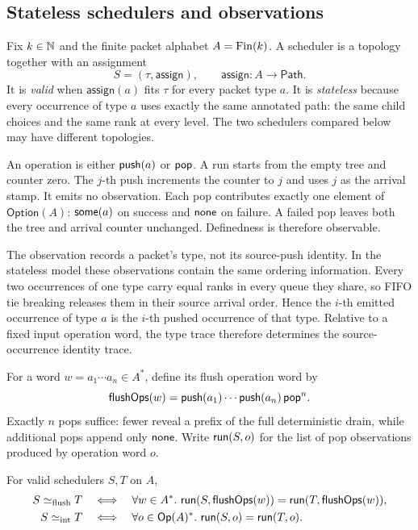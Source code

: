 \subsection{Stateless schedulers and observations}

Fix \(k\in\mathbb{N}\) and the finite packet alphabet \(A=\operatorname{Fin}(k)\).  A scheduler is
a topology together with an assignment
\[
  S=(\tau,\mathsf{assign}),
  \qquad \mathsf{assign}:A\to\mathsf{Path}.
\]
It is \emph{valid} when \(\mathsf{assign}(a)\) fits \(\tau\) for every packet
type \(a\).  It is \emph{stateless} because every occurrence of type \(a\)
uses exactly the same annotated path: the same child choices and the same rank
at every level.  The two schedulers compared below may have different
topologies.

An operation is either \(\mathsf{push}(a)\) or \(\mathsf{pop}\).  A run starts from the empty
tree and counter zero.  The \(j\)-th push increments the counter to \(j\) and
uses \(j\) as the arrival stamp.  It emits no observation.  Each pop contributes
exactly one element of \(\mathsf{Option}(A)\): \(\mathsf{some}(a)\) on success and
\(\mathsf{none}\) on failure.  A failed pop leaves both the tree and arrival counter
unchanged.  Definedness is therefore observable.

The observation records a packet's type, not its source-push identity.  In the
stateless model these observations contain the same ordering information.
Every two occurrences of one type carry equal ranks in every queue they share,
so FIFO tie breaking releases them in their source arrival order.  Hence the
\(i\)-th emitted occurrence of type \(a\) is the \(i\)-th pushed occurrence of
that type.  Relative to a fixed input operation word, the type trace therefore
determines the source-occurrence identity trace.

For a word \(w=a_1\cdots a_n\in A^*\), define its flush operation word by
\begin{equation}
  \mathsf{flushOps}(w)
  =\mathsf{push}(a_1)\cdots\mathsf{push}(a_n)\,\mathsf{pop}^n.
  \label{eq:flush-ops}
\end{equation}
Exactly \(n\) pops suffice: fewer reveal a prefix of the full deterministic
drain, while additional pops append only \(\mathsf{none}\).  Write \(\mathsf{run}(S,o)\) for
the list of pop observations produced by operation word \(o\).

\begin{definition}
For valid schedulers \(S,T\) on \(A\),
\begin{align*}
  S\flusheq T
  &\quad\Longleftrightarrow\quad
    \forall w\in A^*.\ 
    \run(S,\flushOps(w))=\run(T,\flushOps(w)),\\
  S\intereq T
  &\quad\Longleftrightarrow\quad
    \forall o\in\mathsf{Op}(A)^*.\ 
    \run(S,o)=\run(T,o).
\end{align*}
\end{definition}


